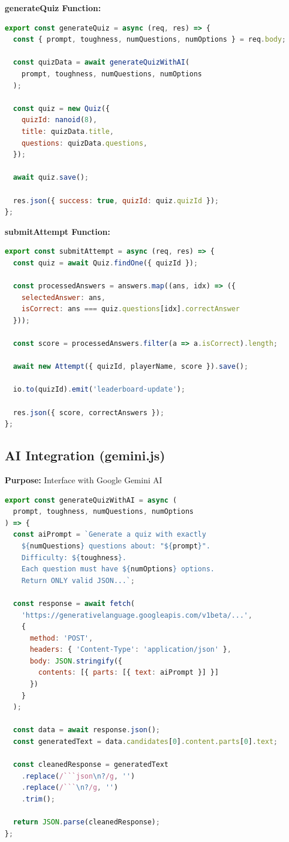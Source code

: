 \documentclass[12pt,a4paper]{article}
\begin{document}
\textbf{generateQuiz Function:}
\begin{lstlisting}[language=JavaScript]
export const generateQuiz = async (req, res) => {
  const { prompt, toughness, numQuestions, numOptions } = req.body;
  
  const quizData = await generateQuizWithAI(
    prompt, toughness, numQuestions, numOptions
  );
  
  const quiz = new Quiz({
    quizId: nanoid(8),
    title: quizData.title,
    questions: quizData.questions,
  });
  
  await quiz.save();
  
  res.json({ success: true, quizId: quiz.quizId });
};
\end{lstlisting}

\textbf{submitAttempt Function:}
\begin{lstlisting}[language=JavaScript]
export const submitAttempt = async (req, res) => {
  const quiz = await Quiz.findOne({ quizId });
  
  const processedAnswers = answers.map((ans, idx) => ({
    selectedAnswer: ans,
    isCorrect: ans === quiz.questions[idx].correctAnswer
  }));
  
  const score = processedAnswers.filter(a => a.isCorrect).length;
  
  await new Attempt({ quizId, playerName, score }).save();
  
  io.to(quizId).emit('leaderboard-update');
  
  res.json({ score, correctAnswers });
};
\end{lstlisting}

\newpage

\subsection{AI Integration (gemini.js)}

\textbf{Purpose:} Interface with Google Gemini AI

\begin{lstlisting}[language=JavaScript]
export const generateQuizWithAI = async (
  prompt, toughness, numQuestions, numOptions
) => {
  const aiPrompt = `Generate a quiz with exactly 
    ${numQuestions} questions about: "${prompt}".
    Difficulty: ${toughness}.
    Each question must have ${numOptions} options.
    Return ONLY valid JSON...`;
  
  const response = await fetch(
    'https://generativelanguage.googleapis.com/v1beta/...',
    {
      method: 'POST',
      headers: { 'Content-Type': 'application/json' },
      body: JSON.stringify({
        contents: [{ parts: [{ text: aiPrompt }] }]
      })
    }
  );
  
  const data = await response.json();
  const generatedText = data.candidates[0].content.parts[0].text;
  
  const cleanedResponse = generatedText
    .replace(/```json\n?/g, '')
    .replace(/```\n?/g, '')
    .trim();
  
  return JSON.parse(cleanedResponse);
};
\end{lstlisting}
\end{document}
